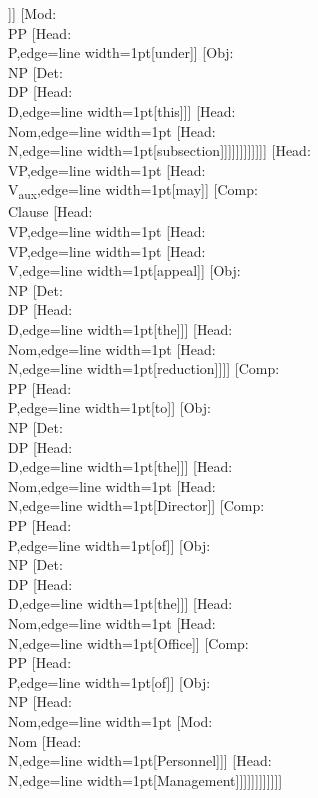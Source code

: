 \documentclass[tikz,border=12pt]{standalone}
\newcommand{\Node}[2]{\small\textsf{#1:}\\{#2}}
\newcommand{\idx}[1]{\textsubscript{\fcolorbox{red}{white}{\textcolor{red}{#1}}}}
\begin{document}
\begin{forest}
                                    [\Node{Mod}{GAP\idx{x}}[--]]]
                                [\Node{Mod}{PP}
                                    [\Node{Head}{P},edge={line width=1pt}[under]]
                                    [\Node{Obj}{NP}
                                        [\Node{Det}{DP}
                                            [\Node{Head}{D},edge={line width=1pt}[this]]]
                                        [\Node{Head}{Nom},edge={line width=1pt}
                                            [\Node{Head}{N},edge={line width=1pt}[subsection]]]]]]]]]]]]
    [\Node{Head}{VP},edge={line width=1pt}
        [\Node{Head}{V\textsubscript{aux}},edge={line width=1pt}[may]]
        [\Node{Comp}{Clause}
            [\Node{Head}{VP},edge={line width=1pt}
                [\Node{Head}{VP},edge={line width=1pt}
                    [\Node{Head}{V},edge={line width=1pt}[appeal]]
                    [\Node{Obj}{NP}
                        [\Node{Det}{DP}
                            [\Node{Head}{D},edge={line width=1pt}[the]]]
                        [\Node{Head}{Nom},edge={line width=1pt}
                            [\Node{Head}{N},edge={line width=1pt}[reduction]]]]
                    [\Node{Comp}{PP}
                        [\Node{Head}{P},edge={line width=1pt}[to]]
                        [\Node{Obj}{NP}
                            [\Node{Det}{DP}
                                [\Node{Head}{D},edge={line width=1pt}[the]]]
                            [\Node{Head}{Nom},edge={line width=1pt}
                                [\Node{Head}{N},edge={line width=1pt}[Director]]
                                [\Node{Comp}{PP}
                                    [\Node{Head}{P},edge={line width=1pt}[of]]
                                    [\Node{Obj}{NP}
                                        [\Node{Det}{DP}
                                            [\Node{Head}{D},edge={line width=1pt}[the]]]
                                        [\Node{Head}{Nom},edge={line width=1pt}
                                            [\Node{Head}{N},edge={line width=1pt}[Office]]
                                            [\Node{Comp}{PP}
                                                [\Node{Head}{P},edge={line width=1pt}[of]]
                                                [\Node{Obj}{NP}
                                                    [\Node{Head}{Nom},edge={line width=1pt}
                                                        [\Node{Mod}{Nom}
                                                            [\Node{Head}{N},edge={line width=1pt}[Personnel]]]
                                                        [\Node{Head}{N},edge={line width=1pt}[Management]]]]]]]]]]]]

\end{forest}
\end{document}
